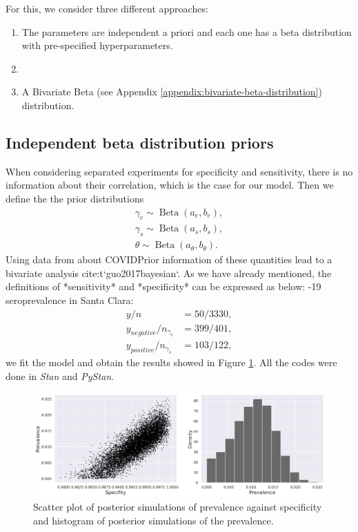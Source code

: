 For this, we consider three different approaches: 

\begin{enumerate}
  \item The parameters are independent a priori and each one has a beta
  distribution with pre-specified hyperparameters.
  \item {}
  \item A Bivariate Beta (see Appendix
  \ref{appendix:bivariate-beta-distribution}) 
  distribution.
\end{enumerate}

\subsection{Independent beta distribution priors}

When considering separated experiments for specificity and
sensitivity, there is
no information about their correlation, which is the case for our model. Then we define the the prior distributions
\begin{gather*}
  \gamma_e \sim \operatorname{Beta}(a_e, b_e), \\
  \gamma_s \sim \operatorname{Beta}(a_s, b_s), \\
  \theta \sim \operatorname{Beta}(a_{\theta}, b_{\theta}).
\end{gather*} 
Using data from \cite{bennett2020estimating} about COVIDPrior information of these quantities lead to a bivariate analysis {cite:t}`guo2017bayesian`. As we have already mentioned, the definitions of *sensitivity* and
*specificity* can be expressed as below: -19 seroprevalence in
Santa Clara:  
\begin{align*}
  y/n &= 50/3330,\\
y_{negative}/n_{\gamma_e} &= 399/401, \\
y_{positive}/n_{\gamma_s} &= 103/122, 
\end{align*}
we fit the model and obtain the results showed in Figure
\ref{fig:results-posterior-model1}. All the codes were done in {\em Stan} and
{\em PyStan}.

\begin{figure}[!ht]
  \centering
  \includegraphics[width=\textwidth]{../../images/model1_gelman_figure_english.png}
  \caption{Scatter plot of posterior simulations of prevalence against
  specificity and histogram of posterior simulations of the prevalence.}
  \label{fig:results-posterior-model1}
\end{figure}

